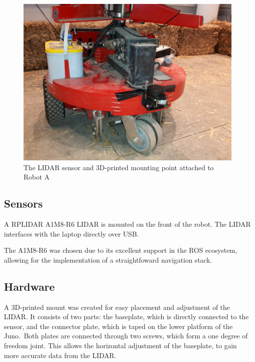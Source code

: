 \documentclass[11pt]{article}
\begin{document}
	\begin{figure}[h!]
		\centering
		\includegraphics[scale=0.1]{robot_a}
		\caption{The LIDAR sensor and 3D-printed mounting point attached to Robot A}
	\end{figure}
	
	\subsection{Sensors}
	A RPLIDAR A1M8-R6 LIDAR is mounted on the front of the robot. The LIDAR interfaces with the laptop directly over USB. \newline
	
	The A1M8-R6 was chosen due to its excellent support in the ROS ecosystem, allowing for the implementation of a straightfoward navigation stack. 
	
	\subsection{Hardware}
	A 3D-printed mount was created for easy placement and adjustment of the LIDAR. It consists of two parts: the baseplate, which is directly connected to the sensor, and the connector plate, which is taped on the lower platform of the Juno. Both plates are connected through two screws, which form a one degree of freedom joint. This allows the horizontal adjustment of the baseplate, to gain more accurate data from the LIDAR. 
	
\end{document}

